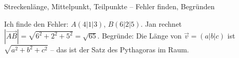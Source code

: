 \begin{aufgabe}{Streckenlänge, Mittelpunkt, Teilpunkte – Fehler finden, Begründen}
\begin{teile}
\teil Ich finde den Fehler: $A(4 | 1 | 3)$, $B(6 | 2 | 5)$. Jan rechnet $|\overrightarrow{AB}| = \sqrt{6^2 + 2^2 + 5^2} = \sqrt{65}$.
\teil Begründe: Die Länge von $\vec v = (a | b | c)$ ist $\sqrt{a^2 + b^2 + c^2}$ – das ist der Satz des Pythagoras im Raum.
\end{teile}
\end{aufgabe}
